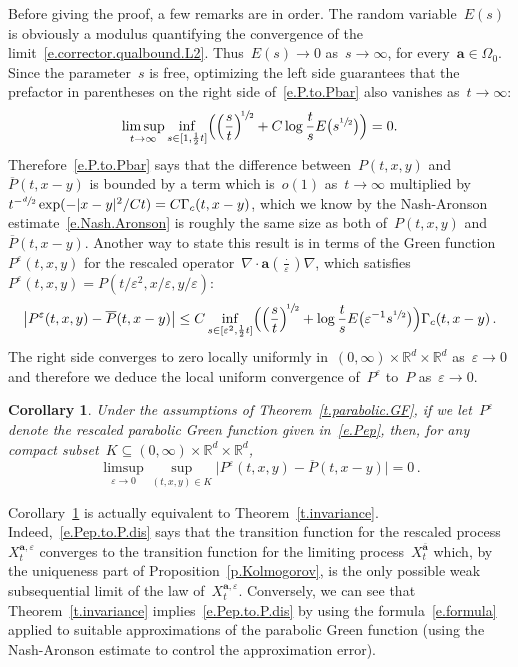 \documentclass[11pt]{article} %
\numberwithin{equation}{section}
\newtheorem{corollary}[theorem]{Corollary}
\theoremstyle{definition}
\newcommand*{\Rd}{\ensuremath{\mathbb{R}^d}}
\newcommand{\eps}{\varepsilon}
\newcommand{\ep}{\eps}
\renewcommand{\a}{\mathbf{a}}
\newcommand{\ahom}{\bar{\a}}
\begin{document}
Before giving the proof, a few remarks are in order. The random variable~$E(s)$ is obviously a modulus quantifying the convergence of the limit~\eqref{e.corrector.qualbound.L2}. Thus~$E(s) \to 0$ as~$s \to \infty$, for every~$\a \in\Omega_0$. Since the parameter~$s$ is free, optimizing the left side guarantees that the prefactor in parentheses on the right side of~\eqref{e.P.to.Pbar} also vanishes as~$t \to \infty$:
\begin{equation*}
\limsup_{t\to \infty} 
\inf_{s \in [1, \frac12 t] } 
\Bigl( 
\Bigl(  \frac{s}{t} \Bigr)^{\!\sfrac12}
+
C  \log \frac{t}{s} 
E\bigl(s^{\sfrac12}\bigr) 
\Bigr)
=
0.
\end{equation*}
Therefore~\eqref{e.P.to.Pbar} says that the difference between~$P(t,x,y)$ and~$\overline{P}(t,x-y)$ is bounded by a term which is~$o(1)$ as~$t \to\infty$ multiplied by~$t^{-\sfrac d2} \exp( - |x-y|^2/Ct) = C\Gamma_c(t,x-y)$, which we know by the Nash-Aronson estimate~\eqref{e.Nash.Aronson} is roughly the same size as both of~$P(t,x,y)$ and~$\overline{P}(t,x-y)$.
Another way to state this result is in terms of the Green function~$P^\ep(t,x,y)$ for the rescaled operator~$\nabla\cdot \a(\tfrac\cdot\ep)\nabla$, which satisfies~$P^\ep (t,x,y) = P( t/\ep^2, x/\ep, y/\ep )$:
\begin{equation}
\label{e.Pep.to.P}
\bigl| P^\ep(t,x,y) - \overline{P}(t,x-y) \bigr| 
\leq
C
\inf_{s \in [\ep^2, \frac12t]} 
\Bigl( 
\Bigl(  \frac{s}{t} \Bigr)^{\!\sfrac12}
+
\log \frac{t}{s} 
E\bigl( \ep^{-1} s^{\sfrac12}\bigr) 
\Bigr)
\Gamma_c(t,x-y)
\,.
\end{equation}
The right side converges to zero locally uniformly in~$(0,\infty)\times \Rd \times \Rd$ as~$\ep \to 0$ and therefore we deduce the local uniform convergence of~$P^\ep$ to~$P$ as~$\ep \to 0$. 


\begin{corollary}
\label{c.Pep.to.P}
Under the assumptions of Theorem~\ref{t.parabolic.GF}, if we let~$P^\ep$ denote the rescaled parabolic Green function given in~\eqref{e.Pep}, then, for any compact subset~$K \subseteq (0,\infty) \times \Rd \times \Rd$, 
\begin{equation}
\label{e.Pep.to.P.dis}
\limsup_{\ep \to 0}
\sup_{(t,x,y) \in K}  
\bigl| P^\ep (t,x,y) - \overline{P}(t,x-y) \bigr| = 0\,.
\end{equation}
\end{corollary}

Corollary~\ref{c.Pep.to.P} is actually equivalent to  Theorem~\ref{t.invariance}. Indeed,~\eqref{e.Pep.to.P.dis} says that the transition function for the rescaled process~$X^{\a,\ep}_t$ converges to the transition function for the limiting process~$X^{\ahom}_t$ which, by the uniqueness part of Proposition~\ref{p.Kolmogorov}, is the only possible weak subsequential limit of the law of~$X^{\a,\ep}_t$. 
Conversely, we can see that Theorem~\ref{t.invariance} implies~\eqref{e.Pep.to.P.dis} by using the formula~\eqref{e.formula} applied to suitable approximations of the parabolic Green function (using the Nash-Aronson estimate to control the approximation error). 
\end{document}
